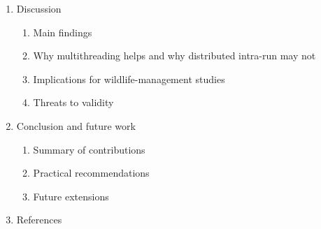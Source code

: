 \begin{enumerate}
    \item Discussion
    \begin{enumerate}
        \item Main findings
        \item Why multithreading helps and why distributed intra-run may not
        \item Implications for wildlife-management studies
        \item Threats to validity
    \end{enumerate}

    \item Conclusion and future work
    \begin{enumerate}
        \item Summary of contributions
        \item Practical recommendations
        \item Future extensions
    \end{enumerate}

    \item References
\end{enumerate}

